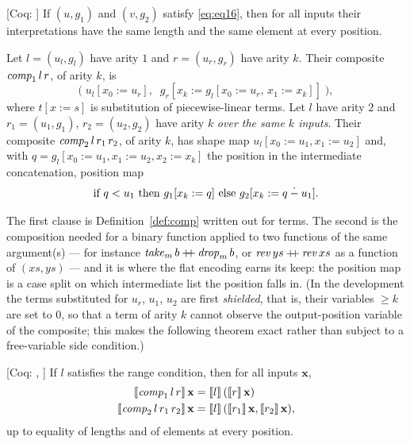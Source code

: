 \documentclass{fundam}
\begin{document}
\begin{theorem}\label{thm:sound}
  \textsf{[Coq: ]}  If $(u, g_1)$ and $(v, g_2)$ satisfy \eqref{eq:eq16},
  then for all inputs their interpretations have the same length and the same element at
  every position.
\end{theorem}

\begin{definition}\label{def:ppcomp}
  Let $l = (u_l, g_l)$ have arity $1$ and $r = (u_r, g_r)$ have arity $k$.  Their
  composite $\mathit{comp}_1\,l\,r$, of arity $k$, is
  \[
    \big(\; u_l[x_0 := u_r],\;\; g_r[x_k := g_l[x_0 := u_r,\, x_1 := x_k]] \;\big),
  \]
  where $t[x := s]$ is substitution of piecewise-linear terms.  Let $l$ have arity $2$ and
  $r_1 = (u_1, g_1)$, $r_2 = (u_2, g_2)$ have arity $k$ \emph{over the same $k$ inputs}.
  Their composite $\mathit{comp}_2\,l\,r_1\,r_2$, of arity $k$, has shape map
  $u_l[x_0 := u_1, x_1 := u_2]$ and, with $q = g_l[x_0 := u_1, x_1 := u_2, x_2 := x_k]$
  the position in the intermediate concatenation, position map
  \[
    \text{if } q < u_1 \text{ then } g_1[x_k := q] \text{ else } g_2[x_k := q \mathbin{\dot{-}} u_1] .
  \]
\end{definition}

The first clause is Definition~\ref{def:comp} written out for terms.  The second is the
composition needed for a binary function applied to two functions of the same argument(s)
--- for instance $\mathit{take}_m\,b \mathbin{+\!\!+} \mathit{drop}_m\,b$, or $\mathit{rev}\,ys \mathbin{+\!\!+} \mathit{rev}\,xs$ as a
function of $(xs, ys)$ --- and it is where the flat encoding earns its keep: the position
map is a case split on which intermediate list the position falls in.  (In the
development the terms substituted for $u_r$, $u_1$, $u_2$ are first \emph{shielded}, that
is, their variables $\ge k$ are set to $0$, so that a term of arity $k$ cannot observe the
output-position variable of the composite; this makes the following theorem exact rather
than subject to a free-variable side condition.)

\begin{theorem}\label{thm:comp}
  \textsf{[Coq: , ]}
  If $l$ satisfies the range condition, then for all inputs $\mathbf{x}$,
  \begin{align*}
    \llbracket \mathit{comp}_1\,l\,r \rrbracket\,\mathbf{x} &= \llbracket l \rrbracket\,(\llbracket r \rrbracket\,\mathbf{x}) \\
    \llbracket \mathit{comp}_2\,l\,r_1\,r_2 \rrbracket\,\mathbf{x} &= \llbracket l \rrbracket\,(\llbracket r_1 \rrbracket\,\mathbf{x}, \llbracket r_2 \rrbracket\,\mathbf{x}),
  \end{align*}
  up to equality of lengths and of elements at every position.
\end{theorem}
\end{document}
